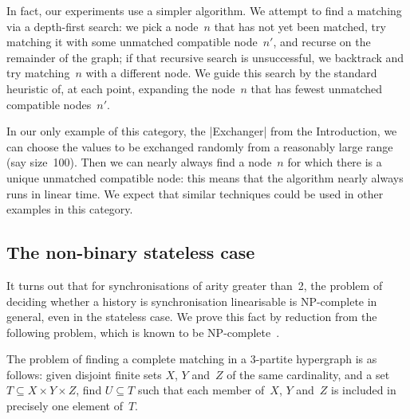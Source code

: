 

In fact, our experiments use a simpler algorithm.  We attempt to find a
matching via a depth-first search: we pick a node~$n$ that has not yet been
matched, try matching it with some unmatched compatible node~$n'$, and recurse
on the remainder of the graph; if that recursive search is unsuccessful, we
backtrack and try matching~$n$ with a different node.  We guide this search by
the standard heuristic of, at each point, expanding the node~$n$ that has
fewest unmatched compatible nodes~$n'$.  

In our only example of this category, the |Exchanger| from the Introduction,
we can choose the values to be exchanged randomly from a reasonably large
range (say size~100).  Then we can nearly always find a node~$n$ for which
there is a unique unmatched compatible node: this means that the algorithm
nearly always runs in linear time.  We expect that similar techniques could be
used in other examples in this category.



\subsection{The non-binary stateless case}
\label{sec:non-binary-stateless}

It turns out that for synchronisations of arity greater than~2, the problem of
deciding whether a history is synchronisation linearisable is NP-complete in
general, even in the stateless case.  We prove this fact by reduction from the
following problem, which is known to be NP-complete~\cite{Karp1972}.
%
\begin{definition}
The problem of finding a complete matching in a 3-partite hypergraph is as
follows: given disjoint finite sets $X$, $Y$ and~$Z$ of the same cardinality,
and a set $T \subseteq X \times Y \times Z$, find $U \subseteq T$ such that
each member of~$X$, $Y$ and~$Z$ is included in precisely one element of~$T$.
\end{definition}

